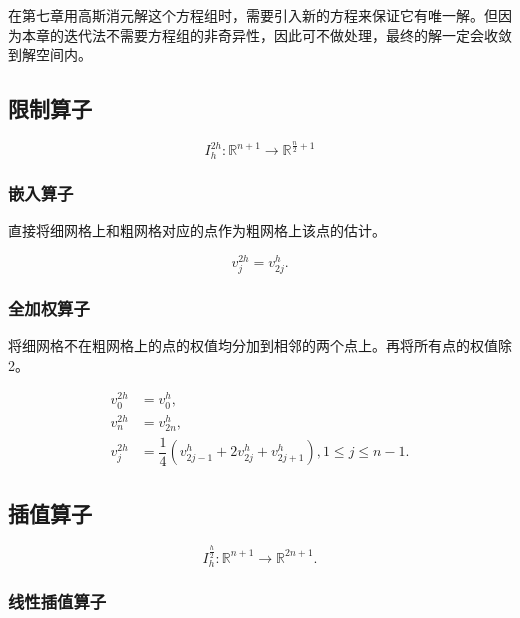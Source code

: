 \documentclass{ctexart}
\begin{document}
在第七章用高斯消元解这个方程组时，需要引入新的方程来保证它有唯一解。但因为本章的迭代法不需要方程组的非奇异性，因此可不做处理，最终的解一定会收敛到解空间内。

\subsection{限制算子}

\begin{equation}
	I_{h}^{2h} : \mathbb{R}^{n+1} \rightarrow \mathbb{R}^{\frac n2+1}
\end{equation}

\subsubsection{嵌入算子}

直接将细网格上和粗网格对应的点作为粗网格上该点的估计。

\begin{equation}
	v_j^{2h} = v_{2j}^h.
\end{equation}

\subsubsection{全加权算子}

将细网格不在粗网格上的点的权值均分加到相邻的两个点上。再将所有点的权值除2。

\begin{equation}
\begin{split}
	v_0^{2h} &= v_0^h,\\
	v_n^{2h} &= v_{2n}^h,\\
	v_j^{2h} &= \dfrac 14(v_{2j-1}^h + 2v_{2j}^h + v_{2j+1}^h),1\leq j\leq n-1.
\end{split}
\end{equation}

\subsection{插值算子}

\begin{equation}
	I_h^{\frac h2} : \mathbb{R}^{n+1} \rightarrow \mathbb{R}^{2n+1}.
\end{equation}

\subsubsection{线性插值算子}
\end{document}
